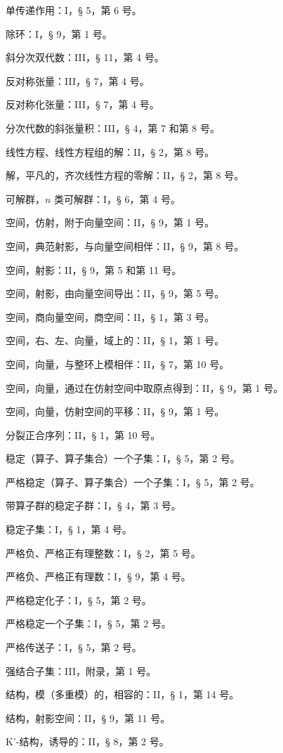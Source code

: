 单传递作用：I，§ 5，第 6 号。

除环：I，§ 9，第 1 号。

斜分次双代数：III，§ 11，第 4 号。

反对称张量：III，§ 7，第 4 号。

反对称化张量：III，§ 7，第 4 号。

分次代数的斜张量积：III，§ 4，第 7 和第 8 号。

线性方程、线性方程组的解：II，§ 2，第 8 号。

解，平凡的，齐次线性方程的零解：II，§ 2，第 8 号。

可解群，\(n\) 类可解群：I，§ 6，第 4 号。

空间，仿射，附于向量空间：II，§ 9，第 1 号。

空间，典范射影，与向量空间相伴：II，§ 9，第 8 号。

空间，射影：II，§ 9，第 5 和第 11 号。

空间，射影，由向量空间导出：II，§ 9，第 5 号。

空间，商向量空间，商空间：II，§ 1，第 3 号。

空间，右、左、向量，域上的：II，§ 1，第 1 号。

空间，向量，与整环上模相伴：II，§ 7，第 10 号。

空间，向量，通过在仿射空间中取原点得到：II，§ 9，第 1 号。

空间，向量，仿射空间的平移：II，§ 9，第 1 号。

分裂正合序列：II，§ 1，第 10 号。

稳定（算子、算子集合）一个子集：I，§ 5，第 2 号。

严格稳定（算子、算子集合）一个子集：I，§ 5，第 2 号。

带算子群的稳定子群：I，§ 4，第 3 号。

稳定子集：I，§ 1，第 4 号。

严格负、严格正有理整数：I，§ 2，第 5 号。

严格负、严格正有理数：I，§ 9，第 4 号。

严格稳定化子：I，§ 5，第 2 号。

严格稳定一个子集：I，§ 5，第 2 号。

严格传送子：I，§ 5，第 2 号。

强结合子集：III，附录，第 1 号。

结构，模（多重模）的，相容的：II，§ 1，第 14 号。

结构，射影空间：II，§ 9，第 11 号。

K'-结构，诱导的：II，§ 8，第 2 号。

